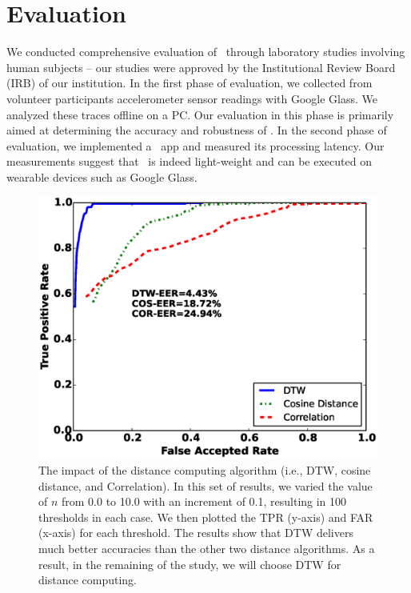 \section{Evaluation}\label{sec:results}

We conducted comprehensive evaluation of \systemname~through laboratory studies involving
human subjects -- our studies were approved by the Institutional Review Board (IRB) of our
institution. In the first phase of evaluation, we collected from volunteer participants accelerometer sensor
readings with Google Glass. We analyzed these traces offline on a PC.
Our evaluation in this phase is primarily aimed at determining the accuracy and robustness of \systemname.
In the second phase of evaluation, we implemented a \systemname~app and measured its processing latency. Our measurements suggest that \systemname~is indeed light-weight and can be executed on wearable devices such as Google Glass.


\begin{figure}\centering
\includegraphics[width=.85\columnwidth]{figure/roc_dtw_cos_cor.eps}
\caption{\label{fig:roc_dtw_cos_cor} The impact of the distance computing algorithm (i.e., DTW, cosine distance, and Correlation). In this set of results, we varied the value of $n$ from 0.0 to 10.0 with an increment of 0.1, resulting in 100 thresholds in each case. We then plotted the TPR (y-axis) and FAR (x-axis) for each threshold. The results show that DTW delivers much better accuracies than the other two distance algorithms. As a result, in the remaining of the study, we will choose DTW for distance computing.}
\end{figure}

